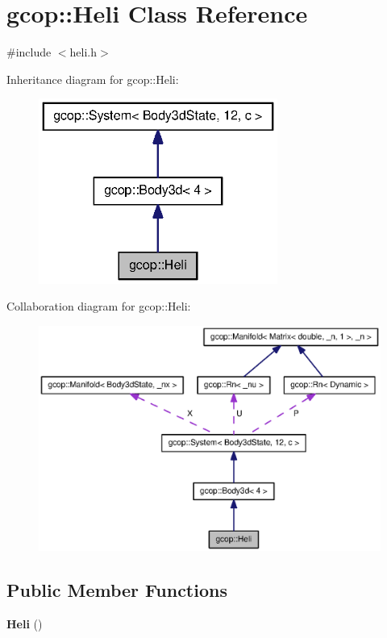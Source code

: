 \section{gcop\-:\-:\-Heli \-Class \-Reference}
\label{classgcop_1_1Heli}


{\ttfamily \#include $<$heli.\-h$>$}



\-Inheritance diagram for gcop\-:\-:\-Heli\-:\nopagebreak
\begin{figure}[H]
\begin{center}
\leavevmode
\includegraphics[width=222pt]{classgcop_1_1Heli__inherit__graph}
\end{center}
\end{figure}


\-Collaboration diagram for gcop\-:\-:\-Heli\-:\nopagebreak
\begin{figure}[H]
\begin{center}
\leavevmode
\includegraphics[width=350pt]{classgcop_1_1Heli__coll__graph}
\end{center}
\end{figure}
\subsection*{\-Public \-Member \-Functions}
\begin{DoxyCompactItemize}
\item 
{\bf \-Heli} ()
\end{DoxyCompactItemize}
